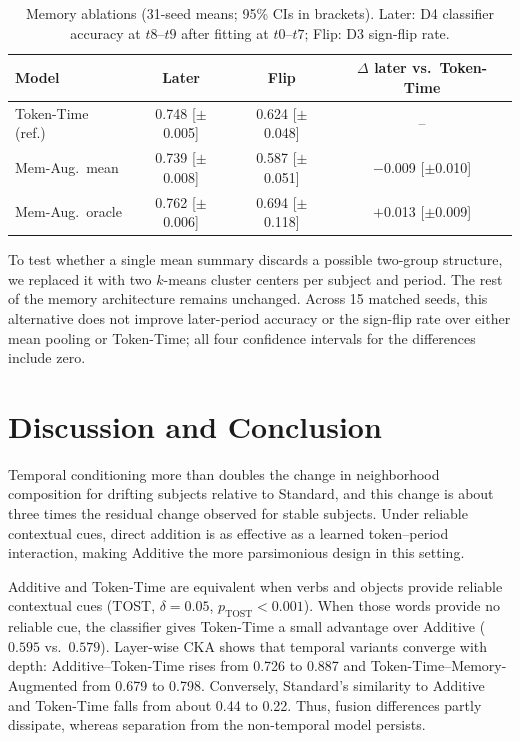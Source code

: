 \documentclass[runningheads]{llncs}
\begin{document}
\begin{table}[!ht]
\caption{Memory ablations (31-seed means; 95\% CIs in brackets). Later: D4
classifier accuracy at \(t8\)--\(t9\) after fitting at \(t0\)--\(t7\); Flip:
D3 sign-flip rate.}
\label{tab:memory-diagnostics}
\centering
\scriptsize
\renewcommand{\arraystretch}{0.88}
\setlength{\tabcolsep}{4pt}
\begin{tabular}{lccc}
\toprule
\textbf{Model} & \textbf{Later} & \textbf{Flip} & \textbf{$\Delta$ later vs.\ Token-Time} \\
\midrule
Token-Time (ref.)  & 0.748 [$\pm$0.005] & 0.624 [$\pm$0.048] & -- \\
Mem-Aug.\ mean  & 0.739 [$\pm$0.008] & 0.587 [$\pm$0.051] & $-$0.009 [$\pm$0.010] \\
Mem-Aug.\ oracle   & 0.762 [$\pm$0.006] & 0.694 [$\pm$0.118] & $+$0.013 [$\pm$0.009] \\
\bottomrule
\end{tabular}
\end{table}

To test whether a single mean summary discards a possible two-group structure,
we replaced it with two \(k\)-means cluster centers per subject and period. The
rest of the memory architecture remains unchanged. Across 15 matched seeds,
this alternative does not improve later-period accuracy or the sign-flip rate
over either mean pooling or Token-Time; all four confidence intervals for the
differences include zero.

\section{Discussion and Conclusion}
Temporal conditioning more than doubles the change in neighborhood composition
for drifting subjects relative to Standard, and this change is about three
times the residual change observed for stable subjects. Under reliable
contextual cues, direct addition is as effective as a learned token--period
interaction, making Additive the more parsimonious design in this setting.

Additive and Token-Time are equivalent when verbs and objects provide reliable
contextual cues (TOST, \(\delta=0.05\), \(p_\mathrm{TOST}<0.001\)). When those
words provide no reliable cue, the classifier gives Token-Time a small
advantage over Additive (\(0.595\) vs.\ \(0.579\)). Layer-wise CKA shows that
temporal variants converge with depth: Additive--Token-Time rises from 0.726 to
0.887 and Token-Time--Memory-Augmented from 0.679 to 0.798. Conversely,
Standard's similarity to Additive and Token-Time falls from about 0.44 to 0.22.
Thus, fusion differences partly dissipate, whereas separation from the
non-temporal model persists.
\end{document}
